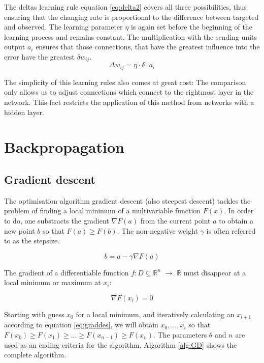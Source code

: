 \documentclass[10pt,a4paper,DIV=11]{scrreprt}
\begin{document}
The deltas learning rule equation \eqref{eq:delta2} covers all three possibilities, thus ensuring that the changing rate is proportional to the difference between targeted and observed. The learning parameter $\eta$ is again set before the beginning of the learning process and remains constant. The multiplication with the sending units output $a_i$ ensures that those connections, that have the greatest influence into the error have the greatest $\delta w_{ij}$.
\begin{equation}
\Delta w_{ij} = \eta \cdot \delta \cdot a_i
\label{eq:delta2}
\end{equation}

The simplicity of this learning rules also comes at great cost: The comparison only allows us to adjust connections which connect to the rightmost layer in the network. This fact restricts the application of this method from networks with a hidden layer. 

\section{Backpropagation}

\subsection{Gradient descent}

The optimisation algorithm gradient descent (also steepest descent) tackles the problem of finding a local minimum of a multivariable function $F(x)$. In order to do, one substracts the gradient $\nabla F(a)$ from the current point $a$ to obtain a new point $b$ so that $F(a) \geq F(b)$. The non-negative weight $\gamma$ is often referred to as the stepsize.

\begin{equation}
 b = a - \gamma \nabla F(a)
\label{eq:graddes}
\end{equation} 

The gradient of a differentiable function $f: D \subseteq \mathds{R}^n$ $\rightarrow$ $\mathds{R}$ must disappear at a local minimum or maximum at $x_i$:\cite{MATHINF}

\begin{equation}
\nabla F(x_i) = 0
\end{equation} 

Starting with guess $x_0$ for a local minimum, and iteratively calculating an $x_{i+1}$ according to equation \eqref{eq:graddes}, we will obtain $x_0, ..., x_i$ so that $F(x_0) \geq F(x_1) \geq ... \geq F(x_{n-1}) \geq F(x_n)$. The parameters $\theta$ and $n$ are  used as an ending criteria for the algorithm. Algorithm \ref{alg:GD} shows the complete algorithm.
\end{document}
